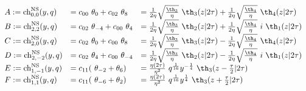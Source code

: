\begin{equation} \label{2^4-char}
  \begin{array}{lll}
A := {\rm ch}_{0,0}^{\rm NS}(y,q) &= c_{00}~\theta_{0} +c_{02}~\theta_{8} 
   &= {1\over 2\eta} \sqrt{\th_3\over\eta} ~\th_3(z|2\tau)
   + {1\over 2\eta} \sqrt{\th_4\over\eta} ~\th_4(z|2\tau)\\ 
B := {\rm ch}_{2,2}^{\rm NS}(y,q) &= c_{02}~\theta_{-4} + c_{00}~\theta_{4}
   &= {1\over 2\eta} \sqrt{\th_3\over\eta} ~\th_2(z|2\tau) 
   + {1\over 2\eta} \sqrt{\th_4\over\eta} ~i ~\th_1(z|2\tau) \\ 
C := {\rm ch}_{2,0}^{\rm NS}(y,q) &= c_{02}~\theta_{0} +c_{00}~\theta_{8} 
   &= {1\over 2\eta} \sqrt{\th_3\over\eta} ~\th_3(z|2\tau)
   - {1\over 2\eta} \sqrt{\th_4\over\eta} ~\th_4(z|2\tau)\\ 
D := {\rm ch}_{2,-2}^{\rm NS}(y,q) &= c_{02}~\theta_{4}+c_{00}~\theta_{-4} 
   &= {1\over 2\eta} \sqrt{\th_3\over\eta} ~\th_2(z|2\tau) 
   - {1\over 2\eta} \sqrt{\th_4\over\eta} ~i ~\th_1(z|2\tau) \\ 
E := {\rm ch}_{1,-1}^{\rm NS}(y,q) &= c_{11}(~\theta_{-2} + \theta_{6})
   &= {\eta(2\tau)\over\eta^2} ~q^{1\over 16} y^{-{1\over
   4}} ~\th_3(z-{\tau\over 2} |2\tau)  \\ 
F := {\rm ch}_{1,1}^{\rm NS}(y,q) &= c_{11}(~\theta_{-6} +\theta_{2}) 
   &= {\eta(2\tau)\over\eta^2} ~q^{1\over 16} y^{1\over
   4} ~\th_3(z+{\tau\over 2} |2\tau) \\ 
  \end{array}
\end{equation}

